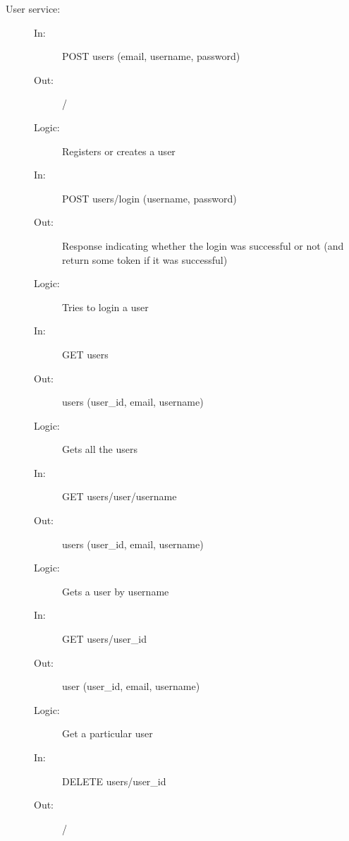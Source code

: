 \documentclass{article}
\begin{document}
\begin{description}
    \item [User service:]
    \begin{description}
        \item[]
        \item[In:] POST users (email, username, password)
        \item[Out:] /
        \item[Logic:] Registers or creates a user
        \item[]
    \end{description}
    \begin{description}
        \item[In:] POST users/login (username, password)
        \item[Out:] Response indicating whether the login was successful or not (and return some token if it was successful)
        \item[Logic:] Tries to login a user
        \item[]
    \end{description}
    \begin{description}
        \item[In:] GET users
        \item[Out:] users (user\_id, email, username)
        \item[Logic:] Gets all the users
        \item[]
    \end{description}
    \begin{description}
        \item[In:] GET users/user/username
        \item[Out:] users (user\_id, email, username)
        \item[Logic:] Gets a user by username
        \item[]
    \end{description}
    \begin{description}
        \item[In:] GET users/user\_id
        \item[Out:] user (user\_id, email, username)
        \item[Logic:] Get a particular user
        \item[]
    \end{description}
    \begin{description}
        \item[In:] DELETE users/user\_id
        \item[Out:] /

\end{description}
\end{description}
\end{document}
